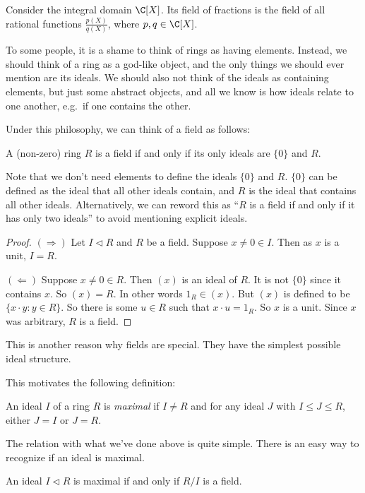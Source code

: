 \documentclass[a4paper]{article}
\begin{document}
\begin{eg}
  Consider the integral domain $\C[X]$. Its field of fractions is the field of all rational functions $\frac{p(X)}{q(X)}$, where $p, q \in \C[X]$.
\end{eg}
To some people, it is a shame to think of rings as having elements. Instead, we should think of a ring as a god-like object, and the only things we should ever mention are its ideals. We should also not think of the ideals as containing elements, but just some abstract objects, and all we know is how ideals relate to one another, e.g.\ if one contains the other.

Under this philosophy, we can think of a field as follows:
\begin{lemma}
  A (non-zero) ring $R$ is a field if and only if its only ideals are $\{0\}$ and $R$.
\end{lemma}
Note that we don't need elements to define the ideals $\{0\}$ and $R$. $\{0\}$ can be defined as the ideal that all other ideals contain, and $R$ is the ideal that contains all other ideals. Alternatively, we can reword this as ``$R$ is a field if and only if it has only two ideals'' to avoid mentioning explicit ideals.

\begin{proof}
  $(\Rightarrow)$ Let $I \lhd R$ and $R$ be a field. Suppose $x \not= 0 \in I$. Then as $x$ is a unit, $I = R$.

  $(\Leftarrow)$ Suppose $x \not= 0 \in R$. Then $(x)$ is an ideal of $R$. It is not $\{0\}$ since it contains $x$. So $(x) = R$. In other words $1_R \in (x)$. But $(x)$ is defined to be $\{x \cdot y: y \in R\}$. So there is some $u \in R$ such that $x\cdot u = 1_R$. So $x$ is a unit. Since $x$ was arbitrary, $R$ is a field.
\end{proof}
This is another reason why fields are special. They have the simplest possible ideal structure.

This motivates the following definition:

\begin{defi}
  An ideal $I$ of a ring $R$ is \emph{maximal} if $I \not= R$ and for any ideal $J$ with $I \leq J \leq R$, either $J = I$ or $J = R$.
\end{defi}

The relation with what we've done above is quite simple. There is an easy way to recognize if an ideal is maximal.

\begin{lemma}
  An ideal $I \lhd R$ is maximal if and only if $R/I$ is a field.
\end{lemma}
\end{document}
